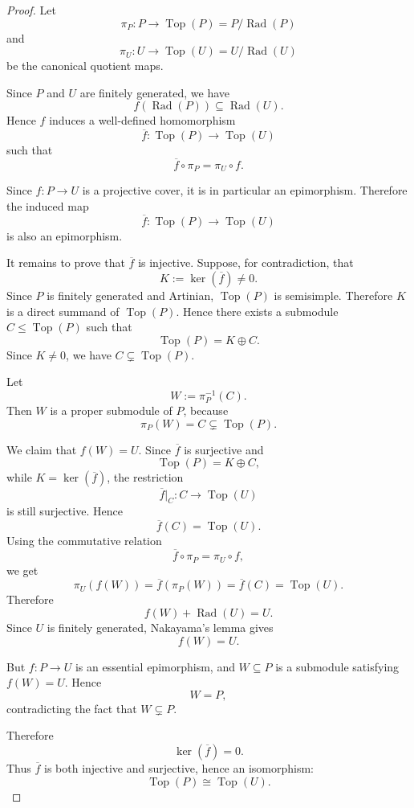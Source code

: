 \begin{proof}
    Let
    \[
        \pi_P:P\longrightarrow \operatorname{Top}(P)=P/\operatorname{Rad}(P)
    \]
    and
    \[
        \pi_U:U\longrightarrow \operatorname{Top}(U)=U/\operatorname{Rad}(U)
    \]
    be the canonical quotient maps.

    Since \(P\) and \(U\) are finitely generated, we have
    \[
        f(\operatorname{Rad}(P))\subseteq \operatorname{Rad}(U).
    \]
    Hence \(f\) induces a well-defined homomorphism
    \[
        \overline{f}:\operatorname{Top}(P)\longrightarrow \operatorname{Top}(U)
    \]
    such that
    \[
        \overline{f}\circ \pi_P=\pi_U\circ f.
    \]

    Since \(f:P\to U\) is a projective cover, it is in particular an epimorphism.
    Therefore the induced map
    \[
        \overline{f}:\operatorname{Top}(P)\to \operatorname{Top}(U)
    \]
    is also an epimorphism.

    It remains to prove that \(\overline{f}\) is injective. Suppose, for contradiction, that
    \[
        K:=\ker(\overline{f})\neq 0.
    \]
    Since \(P\) is finitely generated and Artinian, \(\operatorname{Top}(P)\) is semisimple.
    Therefore \(K\) is a direct summand of \(\operatorname{Top}(P)\). Hence there exists a
    submodule \(C\leq \operatorname{Top}(P)\) such that
    \[
        \operatorname{Top}(P)=K\oplus C.
    \]
    Since \(K\neq 0\), we have \(C\subsetneq \operatorname{Top}(P)\).

    Let
    \[
        W:=\pi_P^{-1}(C).
    \]
    Then \(W\) is a proper submodule of \(P\), because
    \[
        \pi_P(W)=C\subsetneq \operatorname{Top}(P).
    \]

    We claim that \(f(W)=U\). Since \(\overline{f}\) is surjective and
    \[
        \operatorname{Top}(P)=K\oplus C,
    \]
    while \(K=\ker(\overline{f})\), the restriction
    \[
        \overline{f}|_C:C\longrightarrow \operatorname{Top}(U)
    \]
    is still surjective. Hence
    \[
        \overline{f}(C)=\operatorname{Top}(U).
    \]
    Using the commutative relation
    \[
        \overline{f}\circ \pi_P=\pi_U\circ f,
    \]
    we get
    \[
        \pi_U(f(W))
        =
        \overline{f}(\pi_P(W))
        =
        \overline{f}(C)
        =
        \operatorname{Top}(U).
    \]
    Therefore
    \[
        f(W)+\operatorname{Rad}(U)=U.
    \]
    Since \(U\) is finitely generated, Nakayama's lemma gives
    \[
        f(W)=U.
    \]

    But \(f:P\to U\) is an essential epimorphism, and \(W\subseteq P\) is a submodule
    satisfying \(f(W)=U\). Hence
    \[
        W=P,
    \]
    contradicting the fact that \(W\subsetneq P\).

    Therefore
    \[
        \ker(\overline{f})=0.
    \]
    Thus \(\overline{f}\) is both injective and surjective, hence an isomorphism:
    \[
        \operatorname{Top}(P)\cong \operatorname{Top}(U).
    \]
\end{proof}

